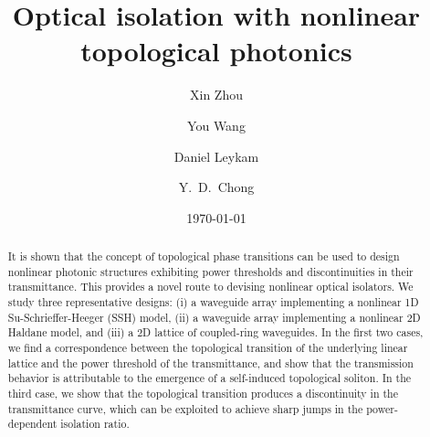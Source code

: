 \documentclass[aps,prx,twocolumn,superscriptaddress]{revtex4-1}
\begin{document}
\title{Optical isolation with nonlinear topological photonics}

\author{Xin Zhou}

\author{You Wang}

\author{Daniel Leykam}

\author{Y.~D.~Chong}



\date{\today}

\begin{abstract}
It is shown that the concept of topological phase transitions can be used to design nonlinear photonic structures exhibiting power thresholds and discontinuities in their transmittance.  This provides a novel route to devising nonlinear optical isolators.  We study three representative designs: (i) a waveguide array implementing a nonlinear 1D Su-Schrieffer-Heeger (SSH) model, (ii) a waveguide array implementing a nonlinear 2D Haldane model, and (iii) a 2D lattice of coupled-ring waveguides.  In the first two cases, we find a correspondence between the topological transition of the underlying linear lattice and the power threshold of the transmittance, and show that the transmission behavior is attributable to the emergence of a self-induced topological soliton.  In the third case, we show that the topological transition produces a discontinuity in the transmittance curve, which can be exploited to achieve sharp jumps in the power-dependent isolation ratio.
\end{abstract}

\maketitle
\end{document}
